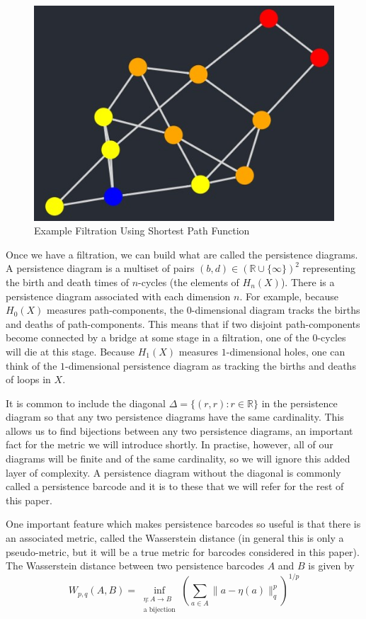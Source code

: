 \documentclass[12pt,a4paper]{amsart}
\numberwithin{equation}{section}
\def\R{{\mathbb R}}
\def\D{\Delta}
\theoremstyle{plain}
\theoremstyle{definition}
\begin{document}
\begin{figure}[h]
	\centering
	\includegraphics[scale=0.8]{ExampleFiltration.jpg}
	\caption{Example Filtration Using Shortest Path Function}
	\label{filtration}
\end{figure}

Once we have a filtration, we can build what are called the persistence diagrams. A persistence diagram is a multiset of pairs $(b,d) \in (\R \cup \{\infty\})^2$ representing the birth and death times of $n$-cycles (the elements of $H_n(X)$).  There is a persistence diagram associated with each dimension $n$. For example, because $H_0(X)$ measures path-components, the $0$-dimensional diagram tracks the births and deaths of path-components. This means that if two disjoint path-components become connected by a bridge at some stage in a filtration, one of the $0$-cycles will die at this stage. Because $H_1(X)$ measures $1$-dimensional holes, one can think of the $1$-dimensional persistence diagram as tracking the births and deaths of loops in $X$.

It is common to include the diagonal $\D = \{(r,r) : r \in \R\}$ in the persistence diagram so that any two persistence diagrams have the same cardinality. This allows us to find bijections between any two persistence diagrams, an important fact for the metric we will introduce shortly. In practise, however, all of our diagrams will be finite and of the same cardinality, so we will ignore this added layer of complexity. A persistence diagram without the diagonal is commonly called a persistence barcode and it is to these that we will refer for the rest of this paper.

One important feature which makes persistence barcodes so useful is that there is an associated metric, called the Wasserstein distance (in general this is only a pseudo-metric, but it will be a true metric for barcodes considered in this paper). The Wasserstein distance between two persistence barcodes $A$ and $B$ is given by
\[W_{p,q}(A,B)= \inf_{\substack{\eta: A \to B \\ \mbox{a bijection}}} \left(\sum_{a \in A} \| a-\eta(a)\|^p_q \right)^{1/p} \]
\end{document}

